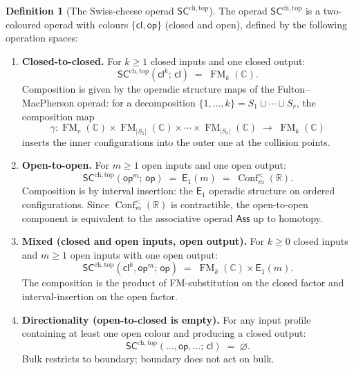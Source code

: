 \documentclass[11pt,reqno]{amsart}
\theoremstyle{definition}
\newtheorem{definition}[theorem]{Definition}
\theoremstyle{remark}
\newcommand{\CC}{\mathbb{C}}
\newcommand{\RR}{\mathbb{R}}
\newcommand{\Eone}{\mathsf{E}_{1}}
\newcommand{\SCchtop}{\mathsf{SC}^{\mathrm{ch,top}}}
\newcommand{\Ass}{\mathsf{Ass}}
\DeclareMathOperator{\Conf}{Conf}
\DeclareMathOperator{\FM}{FM}
\numberwithin{equation}{section}
\begin{document}
\begin{definition}[The Swiss-cheese operad $\SCchtop$]
\label{def:SC-chtop}
The operad $\SCchtop$ is a two-coloured operad with colours
$\{\mathsf{cl}, \mathsf{op}\}$ (closed and open), defined by
the following operation spaces:
\begin{enumerate}[label=(\roman*)]
\item \textbf{Closed-to-closed.}  For $k \geq 1$ closed inputs
  and one closed output:
  \begin{equation}\label{eq:SC-cl-cl}
    \SCchtop(\mathsf{cl}^k;\, \mathsf{cl})
    \;=\;
    \FM_k(\CC).
  \end{equation}
  Composition is given by the operadic structure maps of the
  Fulton--MacPherson operad: for a decomposition
  $\{1,\ldots,k\} = S_1 \sqcup \cdots \sqcup S_r$, the
  composition map
  \[
    \gamma \colon
    \FM_r(\CC) \times \FM_{|S_1|}(\CC) \times \cdots \times
    \FM_{|S_r|}(\CC)
    \;\longrightarrow\;
    \FM_k(\CC)
  \]
  inserts the inner configurations into the outer one at the
  collision points.

\item \textbf{Open-to-open.}  For $m \geq 1$ open inputs and
  one open output:
  \begin{equation}\label{eq:SC-op-op}
    \SCchtop(\mathsf{op}^m;\, \mathsf{op})
    \;=\;
    \Eone(m)
    \;=\;
    \Conf_m^{<}(\RR).
  \end{equation}
  Composition is by interval insertion: the $\Eone$ operadic
  structure on ordered configurations.  Since
  $\Conf_m^{<}(\RR)$ is contractible, the open-to-open
  component is equivalent to the associative operad $\Ass$
  up to homotopy.

\item \textbf{Mixed (closed and open inputs, open output).}
  For $k \geq 0$ closed inputs and $m \geq 1$ open inputs
  with one open output:
  \begin{equation}\label{eq:SC-mix}
    \SCchtop(\mathsf{cl}^k, \mathsf{op}^m;\, \mathsf{op})
    \;=\;
    \FM_k(\CC) \times \Eone(m).
  \end{equation}
  The composition is the product of FM-substitution on the
  closed factor and interval-insertion on the open factor.

\item \textbf{Directionality (open-to-closed is empty).}
  For any input profile containing at least one open colour
  and producing a closed output:
  \begin{equation}\label{eq:SC-direction}
    \SCchtop(\ldots, \mathsf{op}, \ldots;\, \mathsf{cl})
    \;=\;
    \varnothing.
  \end{equation}
  Bulk restricts to boundary; boundary does not act on bulk.
\end{enumerate}
\end{definition}
\end{document}
